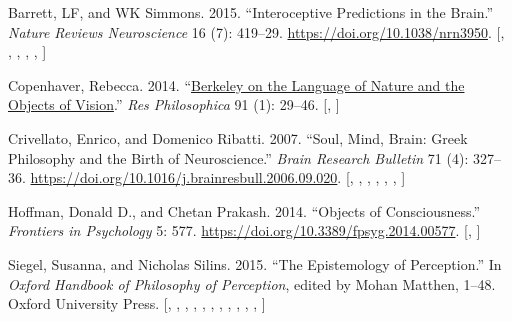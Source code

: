 \documentclass[
  12pt,
  a4paper,
  oneside]{scrbook}
\newlength{\cslhangindent}
\newlength{\cslentryspacingunit} %
\newenvironment{CSLReferences}[2] %
 {%
  \setlength{\parindent}{0pt}
  \ifodd #1
  \let\oldpar\par
  \def\par{\hangindent=\cslhangindent\oldpar}
  \fi
  \setlength{\parskip}{#2\cslentryspacingunit}
 }%
 {}
\begin{document}
\protect\hypertarget{scriv34}{}{}

\hypertarget{refs_multibib34}{}
\begin{CSLReferences}{1}{0}
\leavevmode{}%
Barrett, LF, and WK Simmons. 2015. {``Interoceptive Predictions in the
Brain.''} \emph{Nature Reviews Neuroscience} 16 (7): 419--29.
\url{https://doi.org/10.1038/nrn3950}.
{[},
\protect\hyperlink{cite_2}{\pageref{cite_2}},
\protect\hyperlink{cite_5}{\pageref{cite_5}},
\protect\hyperlink{cite_6}{\pageref{cite_6}},
\protect\hyperlink{cite_7}{\pageref{cite_7}},
\protect\hyperlink{cite_36}{\pageref{cite_36}}{]}

\leavevmode{}%
Copenhaver, Rebecca. 2014. {``\href{}{Berkeley on the Language of Nature
and the Objects of Vision}.''} \emph{Res Philosophica} 91 (1): 29--46.
{[},
\protect\hyperlink{cite_5}{\pageref{cite_5}}{]}

\leavevmode{}%
Crivellato, Enrico, and Domenico Ribatti. 2007. {``Soul, Mind, Brain:
Greek Philosophy and the Birth of Neuroscience.''} \emph{Brain Research
Bulletin} 71 (4): 327--36.
\url{https://doi.org/10.1016/j.brainresbull.2006.09.020}.
{[},
\protect\hyperlink{cite_1}{\pageref{cite_1}},
\protect\hyperlink{cite_2}{\pageref{cite_2}},
\protect\hyperlink{cite_3}{\pageref{cite_3}},
\protect\hyperlink{cite_7}{\pageref{cite_7}},
\protect\hyperlink{cite_26}{\pageref{cite_26}},
\protect\hyperlink{cite_36}{\pageref{cite_36}}{]}

\leavevmode{}%
Hoffman, Donald D., and Chetan Prakash. 2014. {``Objects of
Consciousness.''} \emph{Frontiers in Psychology} 5: 577.
\url{https://doi.org/10.3389/fpsyg.2014.00577}.
{[},
\protect\hyperlink{cite_5}{\pageref{cite_5}}{]}

\leavevmode{}%
Siegel, Susanna, and Nicholas Silins. 2015. {``The Epistemology of
Perception.''} In \emph{Oxford Handbook of Philosophy of Perception},
edited by Mohan Matthen, 1--48. Oxford University Press.
{[},
\protect\hyperlink{cite_5}{\pageref{cite_5}},
\protect\hyperlink{cite_12}{\pageref{cite_12}},
\protect\hyperlink{cite_13}{\pageref{cite_13}},
\protect\hyperlink{cite_17}{\pageref{cite_17}},
\protect\hyperlink{cite_21}{\pageref{cite_21}},
\protect\hyperlink{cite_27}{\pageref{cite_27}},
\protect\hyperlink{cite_32}{\pageref{cite_32}},
\protect\hyperlink{cite_33}{\pageref{cite_33}},
\protect\hyperlink{cite_34}{\pageref{cite_34}},
\protect\hyperlink{cite_35}{\pageref{cite_35}},
\protect\hyperlink{cite_36}{\pageref{cite_36}}{]}


\end{CSLReferences}
\end{document}
